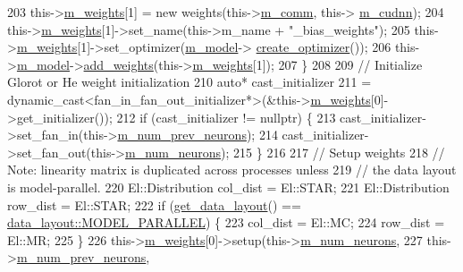 \begin{DoxyCode}
203       this->\hyperlink{classlbann_1_1Layer_a7954e30fbf9100a6ba4b56d02767a469}{m\_weights}[1] = \textcolor{keyword}{new} weights(this->\hyperlink{classlbann_1_1Layer_a5de05c52f22e0bbd7c703bec3ad4dbf2}{m\_comm}, this->
      \hyperlink{classlbann_1_1Layer_a08dbb94239e3b8c96329786c57c72e21}{m\_cudnn});
204       this->\hyperlink{classlbann_1_1Layer_a7954e30fbf9100a6ba4b56d02767a469}{m\_weights}[1]->set\_name(this->m\_name + \textcolor{stringliteral}{"\_bias\_weights"});
205       this->\hyperlink{classlbann_1_1Layer_a7954e30fbf9100a6ba4b56d02767a469}{m\_weights}[1]->set\_optimizer(\hyperlink{classlbann_1_1Layer_a3d9315e99574166f2f33e37b572021d2}{m\_model}->
      \hyperlink{classlbann_1_1model_a0d2d5a1eac592e5721a81a9b9ea4b7f2}{create\_optimizer}());
206       this->\hyperlink{classlbann_1_1Layer_a3d9315e99574166f2f33e37b572021d2}{m\_model}->\hyperlink{classlbann_1_1model_af35fca77e75eb6dd570e4727aa3d5b6b}{add\_weights}(this->\hyperlink{classlbann_1_1Layer_a7954e30fbf9100a6ba4b56d02767a469}{m\_weights}[1]);
207     \}
208 
209     \textcolor{comment}{// Initialize Glorot or He weight initialization}
210     \textcolor{keyword}{auto}* cast\_initializer
211       = \textcolor{keyword}{dynamic\_cast<}fan\_in\_fan\_out\_initializer*\textcolor{keyword}{>}(&this->\hyperlink{classlbann_1_1Layer_a7954e30fbf9100a6ba4b56d02767a469}{m\_weights}[0]->get\_initializer());
212     \textcolor{keywordflow}{if} (cast\_initializer != \textcolor{keyword}{nullptr}) \{
213       cast\_initializer->set\_fan\_in(this->\hyperlink{classlbann_1_1Layer_ac7b30f4e28d58204bfcbb76886f9136d}{m\_num\_prev\_neurons});
214       cast\_initializer->set\_fan\_out(this->\hyperlink{classlbann_1_1Layer_a6b5ebc8a7d9329d8a773ed787e7b41d8}{m\_num\_neurons});
215     \}
216 
217     \textcolor{comment}{// Setup weights}
218     \textcolor{comment}{// Note: linearity matrix is duplicated across processes unless}
219     \textcolor{comment}{// the data layout is model-parallel.}
220     El::Distribution col\_dist = El::STAR;
221     El::Distribution row\_dist = El::STAR;
222     \textcolor{keywordflow}{if} (\hyperlink{classlbann_1_1fully__connected__layer_a0d84bbfa7df80e879da13f54d465a603}{get\_data\_layout}() == \hyperlink{base_8hpp_a786677cbfb3f5677b4d84f3056eb08dbac94d7b0e44ab8bdcdad694a673cdeae0}{data\_layout::MODEL\_PARALLEL}) \{
223       col\_dist = El::MC;
224       row\_dist = El::MR;
225     \}
226     this->\hyperlink{classlbann_1_1Layer_a7954e30fbf9100a6ba4b56d02767a469}{m\_weights}[0]->setup(this->\hyperlink{classlbann_1_1Layer_a6b5ebc8a7d9329d8a773ed787e7b41d8}{m\_num\_neurons},
227                               this->\hyperlink{classlbann_1_1Layer_ac7b30f4e28d58204bfcbb76886f9136d}{m\_num\_prev\_neurons},

\end{DoxyCode}
